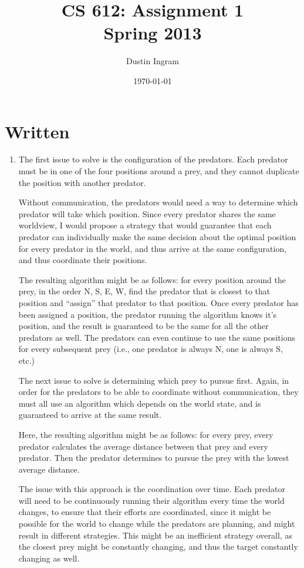 \documentclass{article}
\title{CS 612: Assignment 1\\Spring 2013}
\author{Dustin Ingram}
\date{\today}
\begin{document}
\maketitle

\section*{Written}

\begin{enumerate}[label=(\alph*)]

\item{} %

The first issue to solve is the configuration of the predators. Each predator
must be in one of the four positions around a prey, and they cannot duplicate
the position with another predator.

Without communication, the predators would need a way to determine which
predator will take which position. Since every predator shares the same
worldview, I would propose a strategy that would guarantee that each predator
can individually make the same decision about the optimal position for every
predator in the world, and thus arrive at the same configuration, and thus
coordinate their positions.

The resulting algorithm might be as follows: for every position around the prey,
in the order N, S, E, W, find the predator that is closest to that position and
``assign'' that predator to that position. Once every predator has been assigned
a position, the predator running the algorithm knows it's position, and the
result is guaranteed to be the same for all the other predators as well. The
predators can even continue to use the same positions for every subsequent prey
(i.e., one predator is always N, one is always S, etc.)

The next issue to solve is determining which prey to pursue first. Again, in
order for the predators to be able to coordinate without communication, they
must all use an algorithm which depends on the world state, and is guaranteed to
arrive at the same result.

Here, the resulting algorithm might be as follows: for every prey, every
predator calculates the average distance between that prey and every predator.
Then the predator determines to pursue the prey with the lowest average
distance.

The issue with this approach is the coordination over time. Each predator will
need to be continuously running their algorithm every time the world changes, to
ensure that their efforts are coordinated, since it might be possible for the
world to change while the predators are planning, and might result in different
strategies. This might be an inefficient strategy overall, as the closest prey
might be constantly changing, and thus the target constantly changing as well.


\end{enumerate}
\end{document}
